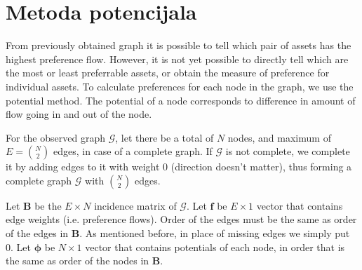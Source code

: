 \documentclass[lmodern, utf8, diplomski, numeric]{fer}
\newcommand{\matr}[1]{\mathbold{#1}}
\newcommand{\graph}[1]{\mathcal{#1}}
\begin{document}
  

  \section{Metoda potencijala}
  \label{sec:metpot}
  From previously obtained graph it is possible to tell which pair of assets has the highest preference flow.
  However, it is not yet possible to directly tell which are the most or least preferrable assets, or obtain the measure of preference for individual assets.
  To calculate preferences for each node in the graph, we use the potential method\cite{caklovic}.
  The potential of a node corresponds to difference in amount of flow going in and out of the node.
  
  For the observed graph $\graph{G}$, let there be a total of $N$ nodes, and maximum of $E = \binom{N}{2}$ edges, in case of a complete graph.
  If $\graph{G}$ is not complete, we complete it by adding edges to it with weight 0 (direction doesn't matter),
  thus forming a complete graph $\graph{G}$ with $\binom{N}{2}$ edges.
  
  Let $\matr{B}$ be the $E \times N$ incidence matrix of $\graph{G}$.
  Let $\matr{f}$ be $E \times 1$ vector that contains edge weights (i.e. preference flows).
  Order of the edges must be the same as order of the edges in $\matr{B}$.
  As mentioned before, in place of missing edges we simply put 0.
  Let $\matr{\phi}$ be $N \times 1$ vector that contains potentials of each node, in order that is the same as order of the nodes in $\matr{B}$.
  
\end{document}
